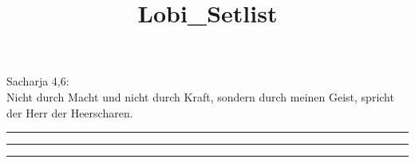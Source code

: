 \documentclass[12pt,a4paper,oneside,final,ngerman]{scrartcl}
\title{Lobi\_Setlist}
\begin{document}
\pagestyle{myheadings}

Sacharja 4,6:\\
Nicht durch Macht und nicht durch Kraft, sondern durch meinen Geist, spricht der Herr der Heerscharen.

\vspace{1cm}
\hrule
\vspace{1cm}





\hrule
\vspace{1cm}





\hrule
\end{document}
